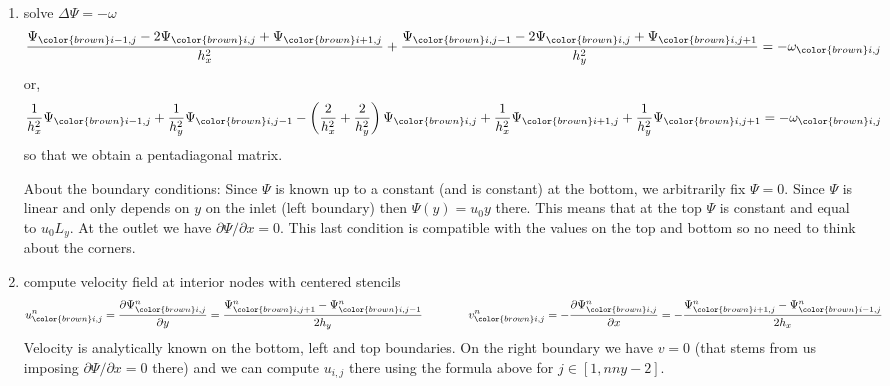 \begin{enumerate}

\item solve $\Delta \Psi = -\omega$ 
\[
\frac{\Psi_{\color{brown} i-1,j}-2\Psi_{\color{brown} i,j}+\Psi_{\color{brown} i+1,j}}{h_x^2}
+
\frac{\Psi_{\color{brown} i,j-1}-2\Psi_{\color{brown} i,j}+\Psi_{\color{brown} i,j+1}}{h_y^2}
=
-\omega_{\color{brown} i,j}
\]
or,
\[
\frac{1}{h_x^2} \Psi_{\color{brown} i-1,j}
+\frac{1}{h_y^2} \Psi_{\color{brown} i,j-1}
-\left(\frac{2}{h_x^2}+\frac{2}{h_y^2} \right)\Psi_{\color{brown} i,j}
+\frac{1}{h_x^2} \Psi_{\color{brown} i+1,j}
+\frac{1}{h_y^2} \Psi_{\color{brown} i,j+1}
=
-\omega_{\color{brown}  i,j}
\]
so that we obtain a pentadiagonal matrix.

About the boundary conditions:
Since $\Psi$ is known up to a constant (and is constant) at the bottom, we arbitrarily fix $\Psi=0$. Since $\Psi$ is linear and only depends on $y$ on the inlet (left boundary) then $\Psi(y)=u_0 y$ there. This means that at the top $\Psi$ is constant and equal to $u_0 L_y$. At the outlet we have $\partial \Psi/\partial x=0$. This last condition is 
compatible with the values on the top and bottom so no need to think about the corners.

\item compute velocity field at interior nodes with centered stencils
\[
u^n_{\color{brown} i,j} = \frac{\partial \Psi^n_{\color{brown} i,j}}{\partial y} = \frac{\Psi^n_{\color{brown} i,j+1}-\Psi^n_{\color{brown} i,j-1}}{2h_y}
\qquad\qquad
v^n_{\color{brown} i,j} = -\frac{\partial \Psi^n_{\color{brown} i,j}}{\partial x} = -\frac{\Psi^n_{\color{brown} i+1,j}-\Psi^n_{\color{brown} i-1,j}}{2 h_x}
\]
Velocity is analytically known on the bottom, left and top boundaries. 
On the right boundary we have $v=0$ (that stems from us imposing $\partial \Psi/\partial x=0$ there) and we can compute $u_{i,j}$ there using the formula above for 
$j\in[1,nny-2]$. 



\end{enumerate}
